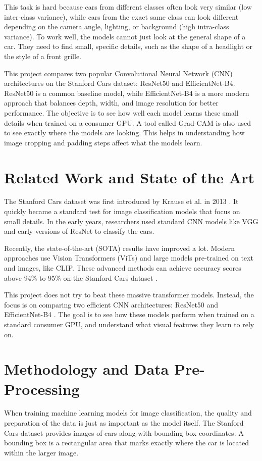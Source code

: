 \documentclass[conference]{IEEEtran}
\begin{document}
This task is hard because cars from different classes often look very similar (low inter-class variance), while cars from the exact same class can look different depending on the camera angle, lighting, or background (high intra-class variance). To work well, the models cannot just look at the general shape of a car. They need to find small, specific details, such as the shape of a headlight or the style of a front grille.

This project compares two popular Convolutional Neural Network (CNN) architectures on the Stanford Cars dataset: ResNet50 and EfficientNet-B4. ResNet50 is a common baseline model, while EfficientNet-B4 is a more modern approach that balances depth, width, and image resolution for better performance. The objective is to see how well each model learns these small details when trained on a consumer GPU. A tool called Grad-CAM is also used to see exactly where the models are looking. This helps in understanding how image cropping and padding steps affect what the models learn.


\section{Related Work and State of the Art}
The Stanford Cars dataset was first introduced by Krause et al. in 2013 \cite{krause20133d}. It quickly became a standard test for image classification models that focus on small details. In the early years, researchers used standard CNN models like VGG and early versions of ResNet to classify the cars.

Recently, the state-of-the-art (SOTA) results have improved a lot. Modern approaches use Vision Transformers (ViTs) and large models pre-trained on text and images, like CLIP. These advanced methods can achieve accuracy scores above 94\% to 95\% on the Stanford Cars dataset \cite{cleanlab_cars, sota_vit}.

This project does not try to beat these massive transformer models. Instead, the focus is on comparing two efficient CNN architectures: ResNet50 \cite{he2016resnet} and EfficientNet-B4 \cite{tan2019efficientnet}. The goal is to see how these models perform when trained on a standard consumer GPU, and understand what visual features they learn to rely on.

\section{Methodology and Data Pre-Processing}
When training machine learning models for image classification, the quality and preparation of the data is just as important as the model itself. The Stanford Cars dataset provides images of cars along with bounding box coordinates. A bounding box is a rectangular area that marks exactly where the car is located within the larger image. 
\end{document}
